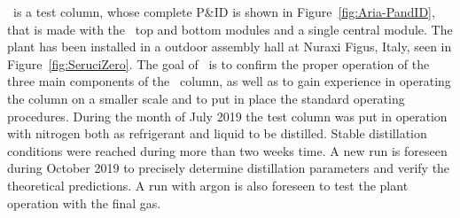 \SeruciZero\ is a  test column, whose complete P\&ID is shown in 
Figure~\ref{fig:Aria-PandID}, that is made with the  \SeruciOne\ top and bottom modules and  a single central module. The plant  has been installed in a outdoor assembly hall at Nuraxi Figus, Italy, seen in Figure~\ref{fig:SeruciZero}.  The goal  of \SeruciZero\ is  to confirm the proper operation of the three main components of the \SeruciOne\ column, as well as to gain experience in operating the column on a smaller scale and to put in place the standard operating procedures.  
During the month of July 2019 the test column was put in operation with nitrogen both as refrigerant and liquid to be distilled. Stable distillation conditions were reached during more than two weeks time. A new run is foreseen during October 2019 to precisely determine distillation parameters and verify the theoretical predictions. A run with argon is also foreseen to test the plant operation with the final gas.

